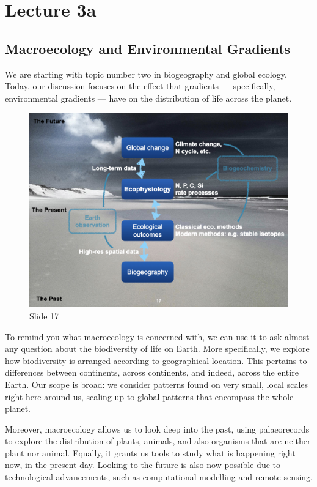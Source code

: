 \documentclass[
  10pt,
]{book}
\begin{document}
\chapter*{Lecture 3a}\label{lecture-3a}

\section{Macroecology and Environmental
Gradients}\label{macroecology-and-environmental-gradients}

We are starting with topic number two in biogeography and global
ecology. Today, our discussion focuses on the effect that gradients ---
specifically, environmental gradients --- have on the distribution of
life across the planet.

\begin{figure}[ht]
\centering
\includegraphics[width=0.8\linewidth]{../images/BDC334/BDC334-017.jpeg}
\caption*{Slide 17}
\end{figure}

To remind you what macroecology is concerned with, we can use it to ask
almost any question about the biodiversity of life on Earth. More
specifically, we explore how biodiversity is arranged according to
geographical location. This pertains to differences between continents,
across continents, and indeed, across the entire Earth. Our scope is
broad: we consider patterns found on very small, local scales right here
around us, scaling up to global patterns that encompass the whole
planet.

Moreover, macroecology allows us to look deep into the past, using
palaeorecords to explore the distribution of plants, animals, and also
organisms that are neither plant nor animal. Equally, it grants us tools
to study what is happening right now, in the present day. Looking to the
future is also now possible due to technological advancements, such as
computational modelling and remote sensing.
\end{document}

